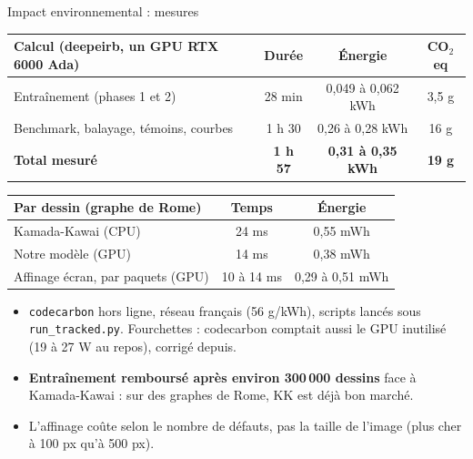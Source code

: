 \documentclass[aspectratio=169,11pt]{beamer}
\begin{document}
\begin{frame}{Impact environnemental : mesures}
\centering
\footnotesize
\renewcommand{\arraystretch}{0.9}
\begin{tabular}{@{}lccc@{}}
\toprule
\textbf{Calcul} (deepeirb, un GPU RTX 6000 Ada) & \textbf{Durée} & \textbf{Énergie} & \textbf{CO$_2$eq} \\
\midrule
Entraînement (phases 1 et 2) & 28 min & 0,049 à 0,062 kWh & 3,5 g \\
Benchmark, balayage, témoins, courbes & 1 h 30 & 0,26 à 0,28 kWh & 16 g \\
\midrule
\textbf{Total mesuré} & \textbf{1 h 57} & \textbf{0,31 à 0,35 kWh} & \textbf{19 g} \\
\bottomrule
\end{tabular}

\vspace{0.12cm}
\begin{tabular}{@{}lcc@{}}
\toprule
\textbf{Par dessin} (graphe de Rome) & \textbf{Temps} & \textbf{Énergie} \\
\midrule
Kamada-Kawai (CPU) & 24 ms & 0,55 mWh \\
Notre modèle (GPU) & 14 ms & 0,38 mWh \\
Affinage écran, par paquets (GPU) & 10 à 14 ms & 0,29 à 0,51 mWh \\
\bottomrule
\end{tabular}

\vspace{0.08cm}
\begin{minipage}{0.95\textwidth}
\scriptsize
\begin{itemize}
\setlength{\itemsep}{1pt}
\item \texttt{codecarbon} hors ligne, réseau français (56 g/kWh), scripts lancés sous \texttt{run\_tracked.py}. Fourchettes : codecarbon comptait aussi le GPU inutilisé (19 à 27 W au repos), corrigé depuis.
\item \textbf{Entraînement remboursé après environ 300\,000 dessins} face à Kamada-Kawai : sur des graphes de Rome, KK est déjà bon marché.
\item L'affinage coûte selon le nombre de défauts, pas la taille de l'image (plus cher à 100 px qu'à 500 px).
\end{itemize}
\end{minipage}
\end{frame}
\end{document}
